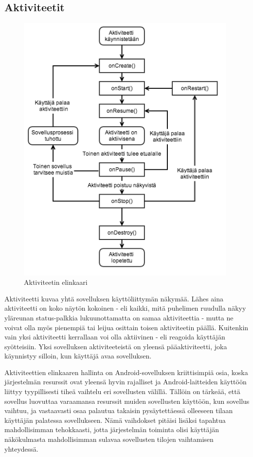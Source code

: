 \subsection{Aktiviteetit}

\begin{figure}[htb]
\includegraphics[width=110mm]{activity_lifecycle.png}
\caption{Aktiviteetin elinkaari \protect\cite{android}} \label{activity_lifecycle}
\end{figure}

Aktiviteetti kuvaa yhtä sovelluksen käyttöliittymän näkymää. Lähes aina aktiviteetti on koko näytön kokoinen - eli kaikki, mitä puhelimen ruudulla näkyy yläreunan status-palkkia lukuunottamatta on samaa aktiviteettia - mutta ne voivat olla myös pienempiä tai leijua osittain toisen aktiviteetin päällä. Kuitenkin vain yksi aktiviteetti kerrallaan voi olla aktiivinen - eli reagoida käyttäjän syötteisiin. Yksi sovelluksen aktiviteeteistä on yleensä pääaktiviteetti, joka käynnistyy silloin, kun käyttäjä avaa sovelluksen. 

Aktiviteettien elinkaaren hallinta on Android-sovelluksen kriittisimpiä osia, koska järjestelmän resurssit ovat yleensä hyvin rajalliset ja Android-laitteiden käyttöön liittyy tyypillisesti tiheä vaihtelu eri sovellusten välillä. Tällöin on tärkeää, että sovellus luovuttaa varaamansa resurssit muiden sovellusten käyttöön, kun sovellus vaihtuu, ja vastaavasti osaa palautua takaisin pysäytettäessä olleeseen tilaan käyttäjän palatessa sovellukseen. Nämä vaihdokset pitäisi lisäksi tapahtua mahdollisimman tehokkaasti, jotta järjestelmän toiminta olisi käyttäjän näkökulmasta mahdollisimman sulavaa sovellusten tilojen vaihtamisen yhteydessä.

